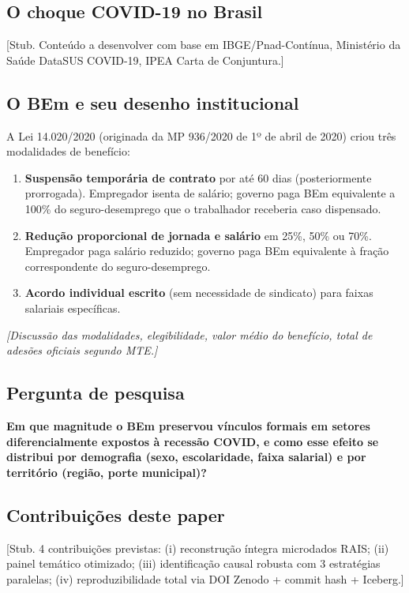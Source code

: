 \documentclass[12pt,a4paper,oneside]{article}
\begin{document}
\subsection{O choque COVID-19 no Brasil}

[Stub. Conteúdo a desenvolver com base em IBGE/Pnad-Contínua,
Ministério da Saúde DataSUS COVID-19, IPEA Carta de Conjuntura.]

\subsection{O BEm e seu desenho institucional}

A Lei 14.020/2020 (originada da MP 936/2020 de 1º de abril de 2020)
criou três modalidades de benefício:

\begin{enumerate}
  \item \textbf{Suspensão temporária de contrato} por até 60 dias
        (posteriormente prorrogada). Empregador isenta de salário;
        governo paga BEm equivalente a 100\% do seguro-desemprego que
        o trabalhador receberia caso dispensado.
  \item \textbf{Redução proporcional de jornada e salário} em 25\%, 50\%
        ou 70\%. Empregador paga salário reduzido; governo paga BEm
        equivalente à fração correspondente do seguro-desemprego.
  \item \textbf{Acordo individual escrito} (sem necessidade de sindicato)
        para faixas salariais específicas.
\end{enumerate}

\textit{[Discussão das modalidades, elegibilidade, valor médio do
benefício, total de adesões oficiais segundo MTE.]}

\subsection{Pergunta de pesquisa}

\textbf{Em que magnitude o BEm preservou vínculos formais em setores
diferencialmente expostos à recessão COVID, e como esse efeito se
distribui por demografia (sexo, escolaridade, faixa salarial) e por
território (região, porte municipal)?}

\subsection{Contribuições deste paper}

[Stub. 4 contribuições previstas:
(i) reconstrução íntegra microdados RAIS;
(ii) painel temático otimizado;
(iii) identificação causal robusta com 3 estratégias paralelas;
(iv) reproduzibilidade total via DOI Zenodo + commit hash + Iceberg.]
\end{document}
